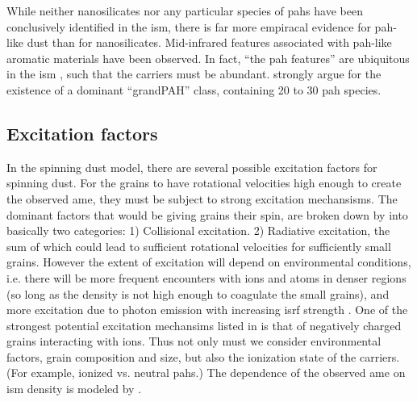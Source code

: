     While neither nanosilicates nor any particular species of \gls{pah}s have been conclusively identified in the \gls{ism}, there is far more empiracal evidence for \gls{pah}-like dust than for nanosilicates. Mid-infrared features associated with \gls{pah}-like aromatic materials have been observed. In fact, ``the \gls{pah} features'' are ubiquitous in the \gls{ism} \citep{giard94,onaka96,onaka00}, such that the carriers must be abundant. \cite{andrews15} strongly argue for the  existence of a dominant ``grandPAH'' class, containing 20 to 30 \gls{pah} species.

     \subsection{Excitation factors}
       In the spinning dust model, there are several possible excitation factors for spinning dust. For the grains to have rotational velocities high enough to create the observed \gls{ame}, they must be subject to strong excitation mechansisms. The dominant factors that would be giving grains their spin, are broken down by \cite{draine11} into basically two categories: 1) Collisional excitation. 2) Radiative excitation, the sum of which could lead to sufficient rotational velocities for sufficiently small grains. However the extent of excitation will depend on environmental conditions, i.e. there will be more frequent encounters with ions and atoms in denser regions (so long as the density is not high enough to coagulate the small grains), and more excitation due to photon emission with increasing \gls{isrf} strength \citep{ali-haimoud09, ali-haimoud14}. One of the strongest potential excitation mechansims listed in \cite{draine11} is that of negatively charged grains interacting with ions. Thus not only must we consider environmental factors, grain composition and size, but also the ionization state of the carriers. (For example, ionized vs. neutral \gls{pah}s.) The dependence of the observed \gls{ame} on \gls{ism} density is modeled by \cite{ali-haimoud10}.

